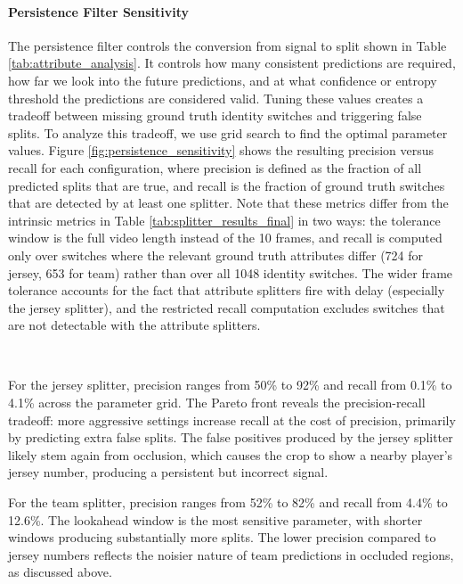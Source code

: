 \paragraph{Persistence Filter Sensitivity}
The persistence filter controls the conversion from signal to split shown in Table \ref{tab:attribute_analysis}. It controls how many consistent predictions are required, how far we look into the future predictions, and at what confidence or entropy threshold the predictions are considered valid. Tuning these values creates a tradeoff between missing ground truth identity switches and triggering false splits. To analyze this tradeoff, we use grid search to find the optimal parameter values. Figure \ref{fig:persistence_sensitivity}  shows the resulting precision versus recall for each configuration, where precision is defined as the fraction of all predicted splits that are true, and recall is the fraction of ground truth switches that are detected by at least one splitter. Note that these metrics differ from the intrinsic metrics in Table \ref{tab:splitter_results_final} in two ways: the tolerance window is the full video length instead of the 10 frames, and recall is computed only over switches where the relevant ground truth attributes differ (724 for jersey, 653 for team) rather than over all 1048 identity switches. The wider frame tolerance accounts for the fact that attribute splitters fire with delay (especially the jersey splitter), and the restricted recall computation excludes switches that are not detectable with the attribute splitters.

\

For the jersey splitter, precision ranges from 50\% to 92\% and recall from 0.1\% to 4.1\% across the parameter grid. The Pareto front reveals the precision-recall tradeoff: more aggressive settings increase recall at the cost of precision, primarily by predicting extra false splits. The false positives produced by the jersey splitter likely stem again from occlusion, which causes the crop to show a nearby player's jersey number, producing a persistent but incorrect signal.

For the team splitter, precision ranges from 52\% to 82\% and recall from 4.4\% to 12.6\%. The lookahead window is the most sensitive parameter, with shorter windows producing substantially more splits. The lower precision compared to jersey numbers reflects the noisier nature of team predictions in occluded regions, as discussed above.

\

